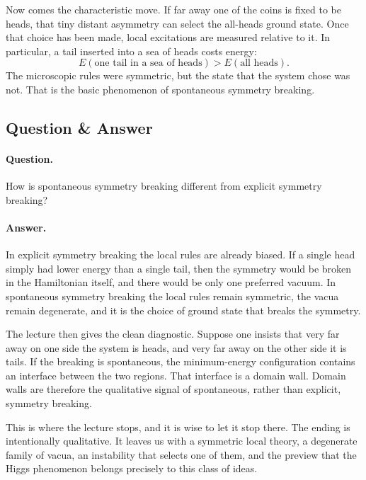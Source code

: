 Now comes the characteristic move. If far away one of the coins is fixed to be heads, that tiny distant asymmetry can select the all-heads ground state. Once that choice has been made, local excitations are measured relative to it. In particular, a tail inserted into a sea of heads costs energy:
\begin{equation}
E(\text{one tail in a sea of heads}) > E(\text{all heads}).
\end{equation}
The microscopic rules were symmetric, but the state that the system chose was not. That is the basic phenomenon of spontaneous symmetry breaking.

\subsection{Question \& Answer}

\paragraph{Question.} How is spontaneous symmetry breaking different from explicit symmetry breaking?

\paragraph{Answer.} In explicit symmetry breaking the local rules are already biased. If a single head simply had lower energy than a single tail, then the symmetry would be broken in the Hamiltonian itself, and there would be only one preferred vacuum. In spontaneous symmetry breaking the local rules remain symmetric, the vacua remain degenerate, and it is the choice of ground state that breaks the symmetry.

The lecture then gives the clean diagnostic. Suppose one insists that very far away on one side the system is heads, and very far away on the other side it is tails. If the breaking is spontaneous, the minimum-energy configuration contains an interface between the two regions. That interface is a domain wall. Domain walls are therefore the qualitative signal of spontaneous, rather than explicit, symmetry breaking.

This is where the lecture stops, and it is wise to let it stop there. The ending is intentionally qualitative. It leaves us with a symmetric local theory, a degenerate family of vacua, an instability that selects one of them, and the preview that the Higgs phenomenon belongs precisely to this class of ideas.

